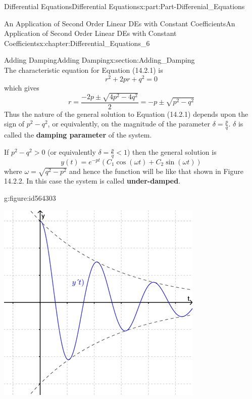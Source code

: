 \documentclass[oneside,10pt,]{book}
\newcommand{\terminology}[1]{\textbf{#1}}
\numberwithin{equation}{section}
\newcommand{\lt}{<}
\newcommand{\gt}{>}
\begin{document}
\begin{partptx}{Differential Equations}{}{Differential Equations}{}{}{x:part:Part-Differenial_Equations}
\begin{chapterptx}{An Application of Second Order Linear DEs with Constant Coefficients}{}{An Application of Second Order Linear DEs with Constant Coefficients}{}{}{x:chapter:Differential_Equations_6}
\begin{sectionptx}{Adding Damping}{}{Adding Damping}{}{}{x:section:Adding_Damping}
\begin{equation}
\end{equation}
The characteristic equation for Equation (14.2.1) is%
\begin{equation*}
r^2+2pr+q^2=0
\end{equation*}
which gives%
\begin{equation*}
r=\frac{-2p\pm \sqrt{4p^2-4q^2}}{2}=-p\pm \sqrt{p^2-q^2}
\end{equation*}
Thus the nature of the general solution to Equation (14.2.1) depends upon the sign of \(p^2-q^2\), or equivalently, on the magnitude of the parameter \(\delta=\frac{p}{q}\). \(\delta\) is called the \terminology{damping parameter} of the system.%
\par
If \(p^2-q^2\gt 0\) (or equivalently \(\delta=\frac{p}{q}\lt 1\)) then the general solution is%
\begin{equation*}
y(t)=e^{-pt}(C_1\cos(\omega t)+C_2\sin(\omega t))
\end{equation*}
where \(\omega=\sqrt{q^2-p^2}\) and hence the function will be like that shown in Figure 14.2.2. In this case the system is called \terminology{under-damped}. \begin{figureptx}{}{g:figure:id564303}{}%
\begin{image}{0.2}{0.6}{0.2}%
\includegraphics[width=\linewidth]{./DifferentialEquations/Images/6/figure_5.png}
\end{image}%

\end{figureptx}
\end{sectionptx}
\end{chapterptx}
\end{partptx}
\end{document}
